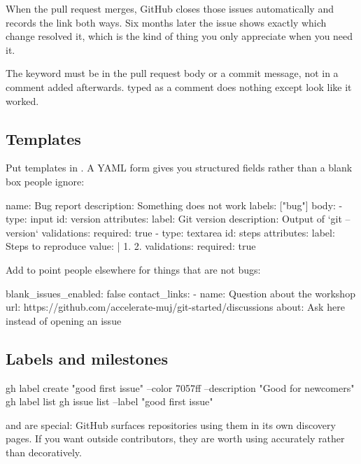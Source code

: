 \documentclass[11pt]{article}
\begin{document}
When the pull request merges, GitHub closes those issues automatically and records
the link both ways. Six months later the issue shows exactly which change resolved
it, which is the kind of thing you only appreciate when you need it.

\begin{note}
The keyword must be in the pull request body or a commit message, not in a comment
added afterwards.  typed as a comment does nothing except look like
it worked.
\end{note}

\subsection{Templates}

Put templates in . A YAML form gives you structured
fields rather than a blank box people ignore:

\begin{terminal}
name: Bug report
description: Something does not work
labels: ["bug"]
body:
  - type: input
    id: version
    attributes:
      label: Git version
      description: Output of `git --version`
    validations:
      required: true
  - type: textarea
    id: steps
    attributes:
      label: Steps to reproduce
      value: |
        1.
        2.
    validations:
      required: true
\end{terminal}

Add  to point people elsewhere for things
that are not bugs:

\begin{terminal}
blank_issues_enabled: false
contact_links:
  - name: Question about the workshop
    url: https://github.com/accelerate-muj/git-started/discussions
    about: Ask here instead of opening an issue
\end{terminal}

\subsection{Labels and milestones}

\begin{shell}
gh label create "good first issue" --color 7057ff --description "Good for newcomers"
gh label list
gh issue list --label "good first issue"
\end{shell}

 and  are special: GitHub surfaces repositories
using them in its own discovery pages. If you want outside contributors, they are
worth using accurately rather than decoratively.
\end{document}

